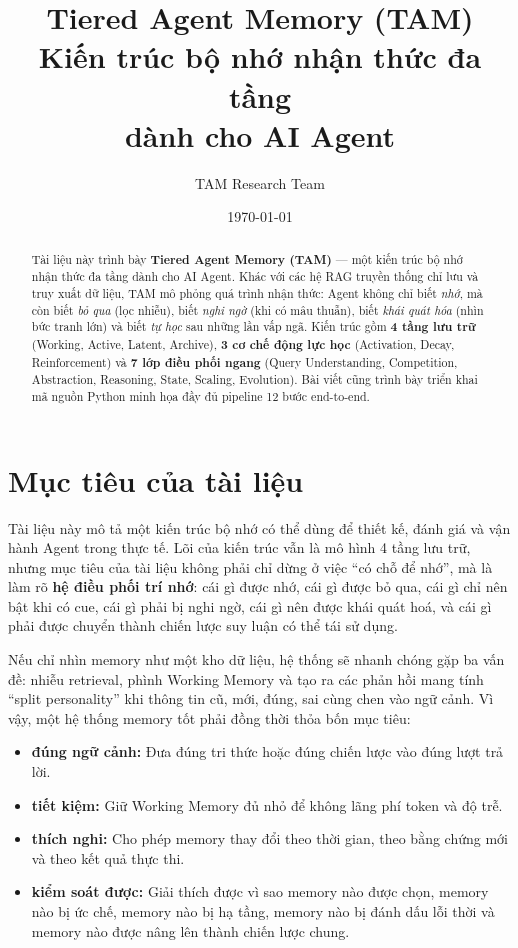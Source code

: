\documentclass[a4paper,12pt]{article}
\title{\textbf{Tiered Agent Memory (TAM)}\\[6pt]
  \large Kiến trúc bộ nhớ nhận thức đa tầng\\dành cho AI Agent}
\author{TAM Research Team}
\date{\today}
\begin{document}
\maketitle

\begin{abstract}
Tài liệu này trình bày \textbf{Tiered Agent Memory (TAM)} --- một kiến trúc bộ nhớ nhận thức đa tầng dành cho AI Agent. Khác với các hệ RAG truyền thống chỉ lưu và truy xuất dữ liệu, TAM mô phỏng quá trình nhận thức: Agent không chỉ biết \emph{nhớ}, mà còn biết \emph{bỏ qua} (lọc nhiễu), biết \emph{nghi ngờ} (khi có mâu thuẫn), biết \emph{khái quát hóa} (nhìn bức tranh lớn) và biết \emph{tự học} sau những lần vấp ngã. Kiến trúc gồm \textbf{4 tầng lưu trữ} (Working, Active, Latent, Archive), \textbf{3 cơ chế động lực học} (Activation, Decay, Reinforcement) và \textbf{7 lớp điều phối ngang} (Query Understanding, Competition, Abstraction, Reasoning, State, Scaling, Evolution). Bài viết cũng trình bày triển khai mã nguồn Python minh họa đầy đủ pipeline 12 bước end-to-end.
\end{abstract}

\tableofcontents
\newpage

\section{Mục tiêu của tài liệu}

Tài liệu này mô tả một kiến trúc bộ nhớ có thể dùng để thiết kế, đánh giá và vận hành Agent trong thực tế. Lõi của kiến trúc vẫn là mô hình 4 tầng lưu trữ, nhưng mục tiêu của tài liệu không phải chỉ dừng ở việc ``có chỗ để nhớ'', mà là làm rõ \textbf{hệ điều phối trí nhớ}: cái gì được nhớ, cái gì được bỏ qua, cái gì chỉ nên bật khi có cue, cái gì phải bị nghi ngờ, cái gì nên được khái quát hoá, và cái gì phải được chuyển thành chiến lược suy luận có thể tái sử dụng.

Nếu chỉ nhìn memory như một kho dữ liệu, hệ thống sẽ nhanh chóng gặp ba vấn đề: nhiễu retrieval, phình Working Memory và tạo ra các phản hồi mang tính ``split personality'' khi thông tin cũ, mới, đúng, sai cùng chen vào ngữ cảnh. Vì vậy, một hệ thống memory tốt phải đồng thời thỏa bốn mục tiêu:
\begin{itemize}
    \item \textbf{đúng ngữ cảnh:} Đưa đúng tri thức hoặc đúng chiến lược vào đúng lượt trả lời.
    \item \textbf{tiết kiệm:} Giữ Working Memory đủ nhỏ để không lãng phí token và độ trễ.
    \item \textbf{thích nghi:} Cho phép memory thay đổi theo thời gian, theo bằng chứng mới và theo kết quả thực thi.
    \item \textbf{kiểm soát được:} Giải thích được vì sao memory nào được chọn, memory nào bị ức chế, memory nào bị hạ tầng, memory nào bị đánh dấu lỗi thời và memory nào được nâng lên thành chiến lược chung.
\end{itemize}
\end{document}
